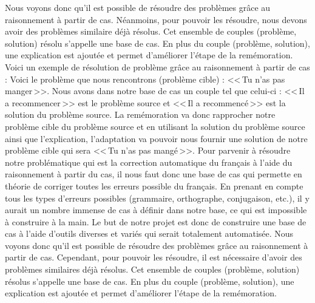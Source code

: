 \documentclass{article}
\begin{document}
Nous voyons donc qu'il est possible de r\'{e}soudre des probl\`{e}mes gr\^ace au raisonnement \`{a} partir de cas. N\'{e}anmoins, pour pouvoir les r\'{e}soudre, nous devons avoir des probl\`{e}mes similaire d\'{e}j\`{a} r\'{e}solus. Cet ensemble de couples (probl\`{e}me, solution) r\'{e}solu s'appelle une base de cas. En plus du couple (probl\`{e}me, solution), une explication est ajout\'{e}e et permet d'am\'{e}liorer l'\'{e}tape de la rem\'{e}moration.
\newline
\newline
Voici un exemple de r\'{e}solution de probl\`{e}me gr\^ace au raisonnement \`{a} partir de cas : 
Voici le probl\`{e}me que nous rencontrons (probl\`{e}me cible) : <<\,Tu n'as pas manger\,>>.
Nous avons dans notre base de cas un couple tel que celui-ci : <<\,Il a recommencer\,>> est le probl\`{e}me source et <<\,Il a recommenc\'{e}\,>> est la solution du probl\`{e}me source.
La rem\'{e}moration va donc rapprocher notre probl\`{e}me cible du probl\`{e}me source et en utilisant la solution du probl\`{e}me source ainsi que l'explication, l'adaptation va pouvoir nous fournir une solution de notre probl\`{e}me cible qui sera <<\,Tu n'as pas mang\'{e}\,>>.
\newline
\newline
Pour parvenir \`{a} r\'{e}soudre notre probl\'{e}matique qui est la correction automatique du fran\c{c}ais \`{a} l'aide du raisonnement \`{a} partir du cas, il nous faut donc une base de cas qui permette en th\'{e}orie de corriger toutes les erreurs possible du fran\c{c}ais. En prenant en compte tous les types d'erreurs possibles (grammaire, orthographe, conjugaison, etc.), il y aurait un nombre immense de cas \`{a} d\'{e}finir dans notre base, ce qui est impossible \`{a} construire \`{a} la main. Le but de notre projet est donc de construire une base de cas \`{a} l'aide d'outils diverses et vari\'{e}s qui serait totalement automatis\'{e}e.
\newline
\newline
Nous voyons donc qu'il est possible de r\'{e}soudre des probl\`{e}mes gr\^{a}ce au raisonnement \`{a} partir de cas. Cependant, pour pouvoir les r\'{e}soudre, il est n\'{e}cessaire d'avoir des probl\`{e}mes similaires d\'{e}j\`{a} r\'{e}solus. Cet ensemble de couples (probl\`{e}me, solution) r\'{e}solus s'appelle une base de cas. En plus du couple (probl\`{e}me, solution), une explication est ajout\'{e}e et permet d'am\'{e}liorer l'\'{e}tape de la rem\'{e}moration.
\newline
\newline
\end{document}
